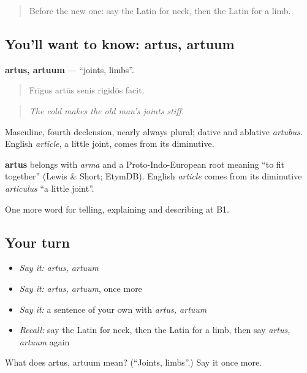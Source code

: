 \label{lesson:LA-C516-artus}



\begin{quote}
Before the new one: say the Latin for neck, then the Latin for a limb.
\end{quote}

\subsection*{You'll want to know: artus, artuum}
\textbf{artus, artuum} — \textquotedblleft{}joints, limbs\textquotedblright{}.

\begin{quote}
Frīgus artūs senis rigidōs facit.
\end{quote}

\begin{quote}
\emph{The cold makes the old man's joints stiff.}
\end{quote}

Masculine, fourth declension, nearly always plural; dative and ablative \emph{artubus}. English \emph{article}, a little joint, comes from its diminutive.

\begin{cousinweb}
\textbf{artus} belongs with \emph{arma} and a Proto-Indo-European root meaning \textquotedblleft{}to fit together\textquotedblright{} (Lewis \& Short; EtymDB). English \emph{article} comes from its diminutive \emph{articulus} \textquotedblleft{}a little joint\textquotedblright{}.
\end{cousinweb}

\begin{grammarlens}[title={What you've built}]
One more word for telling, explaining and describing at B1.
\end{grammarlens}

\subsection*{Your turn}
\begin{itemize}
\raggedright
  \item \emph{Say it:} \emph{artus, artuum}
  \item \emph{Say it:} \emph{artus, artuum}, once more
  \item \emph{Say it:} a sentence of your own with \emph{artus, artuum}
  \item \emph{Recall:} say the Latin for neck, then the Latin for a limb, then say \emph{artus, artuum} again
\end{itemize}

\begin{tcolorbox}[breakable,colback=teal!4,colframe=teal!35!black,title={Before you move on}]
What does artus, artuum mean? (\textquotedblleft{}Joints, limbs\textquotedblright{}.) Say it once more.
\end{tcolorbox}

